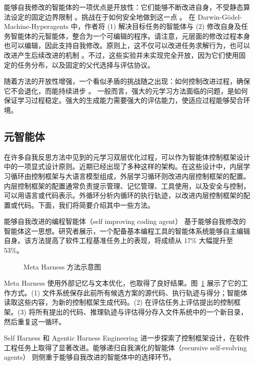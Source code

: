 能够自我修改的智能体的一项优点是开放性：它们能够不断改进自身，不受静态算法设定的固定边界限制 \citep{schmidhuber2007godel}。挑战在于如何安全地做到这一点 \citep{zhang2026darwingodelmachineopenended}。
在 Darwin-G\"odel-Machine-Hyperagents 中，作者将 (1) 解决目标任务的智能体与 (2) 修改自身及任务智能体的元智能体，整合为一个可编辑的程序。请注意，元层面的修改过程本身也可以编辑，因此支持自我修改。原则上，这不仅可以改进任务求解行为，也可以改进产生后续改进的机制 \citep{zhang2026hyperagents}。不过，这些实验并未实现完全开放，因为它们使用固定的任务分布，以及固定的父代选择与评估协议。

随着方法的开放性增强，一个看似矛盾的挑战随之出现：如何控制改进过程，确保它不会退化，而能持续进步 \citep{cemri2025multi,ecoffet2020open}。
一般而言，强大的元学习方法面临的问题，是如何保证学习过程稳定。强大的生成能力需要强大的评估能力，使适应过程能够契合环境。

\subsection{元智能体}
在许多自我反思方法中见到的元学习双层优化过程，可以作为智能体控制框架设计中的一项显式设计原则。近期已经出现了多种这样的架构。在这些设计中，内层学习循环由控制框架与大语言模型组成，外层学习循环则改进内层控制框架的配置。内层控制框架的配置通常负责提示管理、记忆管理、工具使用，以及安全与控制，可以用语言或代码表示。外循环分析内循环的执行轨迹，以改进内层控制框架的配置或代码。下面，我们将简要介绍其中一些方法。


能够自我改进的编程智能体（self improving coding agent）\citep{robeyns2025self} 基于能够自我修改的智能体这一思想。研究者展示，一个配备基本编程工具的智能体系统能够自主编辑自身。该方法提高了软件工程基准任务上的表现，将成绩从 17\% 大幅提升至 53\%。

\begin{figure}
    \centering
    
    \caption{Meta Harness 方法示意图 \citep{lee2026meta}}
    \label{fig:metaharness}
\end{figure}

Meta Harness \citep{lee2026meta} 使用外部记忆与文本优化，也取得了良好结果。图~\ref{fig:metaharness} 展示了它的工作方式。(1) 文件系统保存此前所有候选方案的源代码、执行轨迹与得分；智能体读取这些内容，为新的控制框架生成代码。(2) 在评估任务上评估提出的控制框架。(3) 将所有提出的代码、推理轨迹与评估得分存入文件系统中的一个新目录，然后重复这一循环。

Self Harness \citep{zhang2026self} 和 Agentic Harness Engineering \citep{lin2026agentic} 进一步探索了控制框架设计，在软件工程任务上取得了显著改进。能够递归自我演化的智能体（recursive self-evolving agents）\citep{nguyen2026recursive} 则侧重于能够自我改进的智能体中的选择环节。

